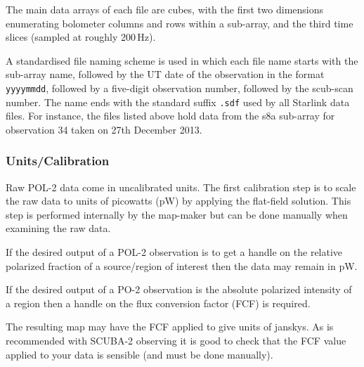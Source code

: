 The main data arrays of each file are cubes, with the first two
dimensions enumerating bolometer columns and rows within a sub-array,
and the third time slices (sampled at roughly 200\,Hz).

A standardised file naming scheme is used in which each file name starts
with the sub-array name, followed by the UT date of the observation in
the format \texttt{yyyymmdd}, followed by a five-digit observation
number, followed by the scub-scan number. The name ends with the standard
suffix \texttt{.sdf} used by all Starlink data files. For instance, the files
listed above hold data from the s8a sub-array for observation 34 taken on
27th December 2013.




\subsubsection*{Units/Calibration}

Raw POL-2 data come in uncalibrated units. The first calibration
step is to scale the raw data to units of picowatts (pW)
by applying the flat-field solution. This step is performed internally
by the map-maker but can be done manually when examining the raw
data.

If the desired output of a POL-2 observation is to get a handle on the relative
polarized fraction of a source/region of interest then the data may remain in
pW.

If the desired output of a PO-2 observation is the absolute polarized intensity
of a region then a handle on the flux conversion factor (FCF) is required.

The resulting map may have the FCF applied to give units of janskys. As is 
recommended with SCUBA-2 observing it is good to check that the FCF value 
applied to your data is sensible (and must be done manually).

